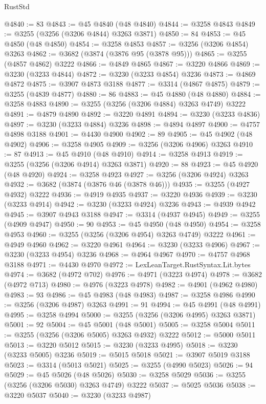 \begin{lexlean}{RustStd}
\begin{coremodule}
{\begin{coremodule}
{{{{{{{{{{{{{{{{{{{{{{{{{{{{{{{{{{{{{@4840 := 83
@4843 := @45 @4840 (@48 @4840)
@4844 := @3258 @4843
@4849 := @3255 (@3256 (@3206 @4844) @3263 @3871)
@4850 := 84
@4853 := @45 @4850 (@48 @4850)
@4854 := @3258 @4853
@4857 := @3256 (@3206 @4854) @3263
@4862 := @3682 (@3874 (@3876 @95 (@3878 @95)))
@4865 := @3255 (@4857 @4862) @3222
@4866 := @4849 @4865
@4867 := @3220 @4866
@4869 := @3230 (@3233 @4844)
@4872 := @3230 (@3233 @4854) @3236
@4873 := @4869 @4872
@4875 := @3907 @4873 @3188
@4877 := @3314 (@4867 @4875)
@4879 := @3255 (@4839 @4877)
@4880 := 86
@4883 := @45 @4880 (@48 @4880)
@4884 := @3258 @4883
@4890 := @3255 (@3256 (@3206 @4884) @3263 @4749) @3222
@4891 := @4879 @4890
@4892 := @3220 @4891
@4894 := @3230 (@3233 @4836)
@4897 := @3230 (@3233 @4884) @3236
@4898 := @4894 @4897
@4900 := @4757 @4898 @3188
@4901 := @4430 @4900
@4902 := 89
@4905 := @45 @4902 (@48 @4902)
@4906 := @3258 @4905
@4909 := @3256 (@3206 @4906) @3263
@4910 := 87
@4913 := @45 @4910 (@48 @4910)
@4914 := @3258 @4913
@4919 := @3255 (@3256 (@3206 @4914) @3263 @3871)
@4920 := 88
@4923 := @45 @4920 (@48 @4920)
@4924 := @3258 @4923
@4927 := @3256 (@3206 @4924) @3263
@4932 := @3682 (@3874 (@3876 @46 (@3878 @46)))
@4935 := @3255 (@4927 @4932) @3222
@4936 := @4919 @4935
@4937 := @3220 @4936
@4939 := @3230 (@3233 @4914)
@4942 := @3230 (@3233 @4924) @3236
@4943 := @4939 @4942
@4945 := @3907 @4943 @3188
@4947 := @3314 (@4937 @4945)
@4949 := @3255 (@4909 @4947)
@4950 := 90
@4953 := @45 @4950 (@48 @4950)
@4954 := @3258 @4953
@4960 := @3255 (@3256 (@3206 @4954) @3263 @4749) @3222
@4961 := @4949 @4960
@4962 := @3220 @4961
@4964 := @3230 (@3233 @4906)
@4967 := @3230 (@3233 @4954) @3236
@4968 := @4964 @4967
@4970 := @4757 @4968 @3188
@4971 := @4430 @4970
@4972 := LexLeanTarget.RustSyntax.Lit.bytes
@4974 := @3682 (@4972 @702)
@4976 := @4971 (@3223 @4974)
@4978 := @3682 (@4972 @713)
@4980 := @4976 (@3223 @4978)
@4982 := @4901 (@4962 @4980)
@4983 := 93
@4986 := @45 @4983 (@48 @4983)
@4987 := @3258 @4986
@4990 := @3256 (@3206 @4987) @3263
@4991 := 91
@4994 := @45 @4991 (@48 @4991)
@4995 := @3258 @4994
@5000 := @3255 (@3256 (@3206 @4995) @3263 @3871)
@5001 := 92
@5004 := @45 @5001 (@48 @5001)
@5005 := @3258 @5004
@5011 := @3255 (@3256 (@3206 @5005) @3263 @4932) @3222
@5012 := @5000 @5011
@5013 := @3220 @5012
@5015 := @3230 (@3233 @4995)
@5018 := @3230 (@3233 @5005) @3236
@5019 := @5015 @5018
@5021 := @3907 @5019 @3188
@5023 := @3314 (@5013 @5021)
@5025 := @3255 (@4990 @5023)
@5026 := 94
@5029 := @45 @5026 (@48 @5026)
@5030 := @3258 @5029
@5036 := @3255 (@3256 (@3206 @5030) @3263 @4749) @3222
@5037 := @5025 @5036
@5038 := @3220 @5037
@5040 := @3230 (@3233 @4987)
}}}}}}}}}}}}}}}}}}}}}}}}}}}}}}}}}}}}}
\end{coremodule}}
\end{coremodule}
\end{lexlean}
